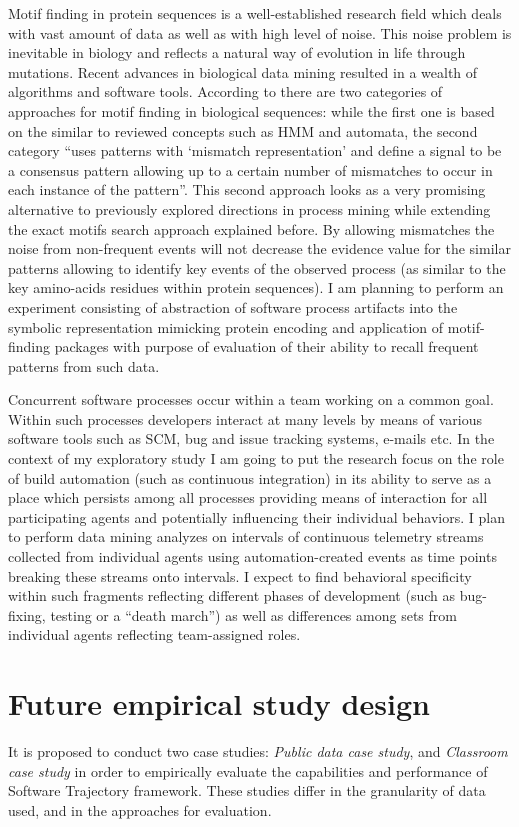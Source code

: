 \documentclass{sig-alternate}
\begin{document}
Motif finding in protein sequences is a well-established research field which deals with vast amount of data as well as with high level of noise. This noise problem is inevitable in biology and reflects a natural way of evolution in life through mutations. Recent advances in biological data mining resulted in a wealth of algorithms and software tools.  According to \cite{citeulike:964046} there are two categories of approaches for motif finding in biological sequences: while the first one is based on the similar to reviewed concepts such as HMM and automata, the second category ``uses patterns with `mismatch representation' and define a signal to be a consensus pattern allowing up to a certain number of mismatches to occur in each instance of the pattern''. This second approach looks as a very promising alternative to previously explored directions in process mining while extending the exact motifs search approach explained before. By allowing mismatches the noise from non-frequent events will not decrease the evidence value for the similar patterns allowing to identify key events of the observed process (as similar to the key amino-acids residues within protein sequences). I am planning to perform an experiment consisting of abstraction of software process artifacts into the symbolic representation mimicking protein encoding and application of motif-finding packages with purpose of evaluation of their ability to recall frequent patterns from such data.

Concurrent software processes occur within a team working on a common goal. Within such processes developers interact at many levels by means of various software tools such as SCM, bug and issue tracking systems, e-mails etc. In the context of my exploratory study I am going to put the research focus on the role of build automation (such as continuous integration) in its ability to serve as a place which persists among all processes providing means of interaction for all participating agents and potentially influencing their individual behaviors. I plan to perform data mining analyzes on intervals of continuous telemetry streams collected from individual agents using automation-created events as time points breaking these streams onto intervals. I expect to find behavioral specificity within such fragments reflecting different phases of development (such as bug-fixing, testing or a ``death march'') as well as differences among sets from individual agents reflecting team-assigned roles.

\section{Future empirical study design}
It is proposed to conduct two case studies: \textit{Public data case study}, and \textit{Classroom case study} in order to empirically evaluate the capabilities and performance of Software Trajectory framework. These studies differ in the granularity of data used, and in the approaches for evaluation. 
\end{document}

